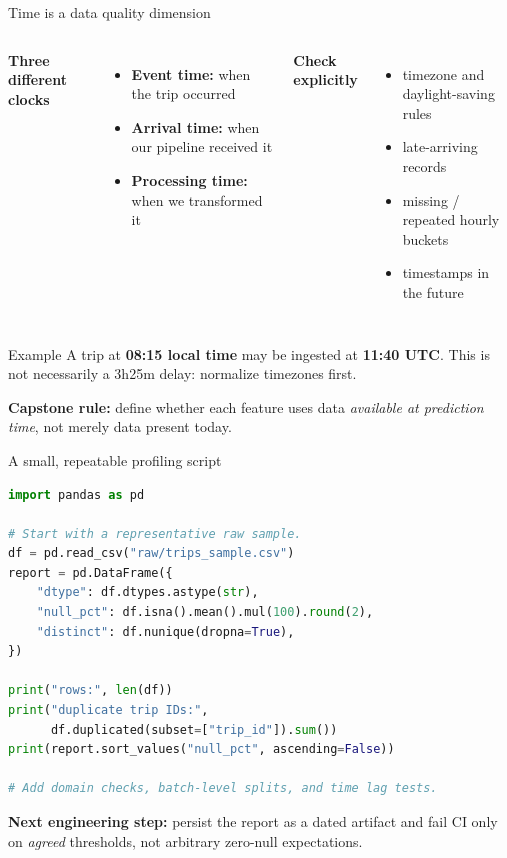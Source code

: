 \documentclass[aspectratio=43,10pt]{beamer}
\begin{document}
\begin{frame}{Time is a data quality dimension}
\begin{columns}[T]
\textbf{Three different clocks}
\begin{itemize}
\item \textbf{Event time:} when the trip occurred
\item \textbf{Arrival time:} when our pipeline received it
\item \textbf{Processing time:} when we transformed it
\end{itemize}
\textbf{Check explicitly}
\begin{itemize}
\item timezone and daylight-saving rules
\item late-arriving records
\item missing / repeated hourly buckets
\item timestamps in the future
\end{itemize}
\end{columns}
\vspace{0.6em}
\begin{block}{Example}
A trip at \textbf{08:15 local time} may be ingested at \textbf{11:40 UTC}. This is not necessarily a 3h25m delay: normalize timezones first.
\end{block}
\textbf{Capstone rule:} define whether each feature uses data \emph{available at prediction time}, not merely data present today.
\end{frame}

\begin{frame}[fragile]{A small, repeatable profiling script}
\begin{lstlisting}[language=Python]
import pandas as pd

# Start with a representative raw sample.
df = pd.read_csv("raw/trips_sample.csv")
report = pd.DataFrame({
    "dtype": df.dtypes.astype(str),
    "null_pct": df.isna().mean().mul(100).round(2),
    "distinct": df.nunique(dropna=True),
})

print("rows:", len(df))
print("duplicate trip IDs:",
      df.duplicated(subset=["trip_id"]).sum())
print(report.sort_values("null_pct", ascending=False))

# Add domain checks, batch-level splits, and time lag tests.
\end{lstlisting}
\vspace{0.2em}
\small \textbf{Next engineering step:} persist the report as a dated artifact and fail CI only on \emph{agreed} thresholds, not arbitrary zero-null expectations.
\end{frame}
\end{document}
